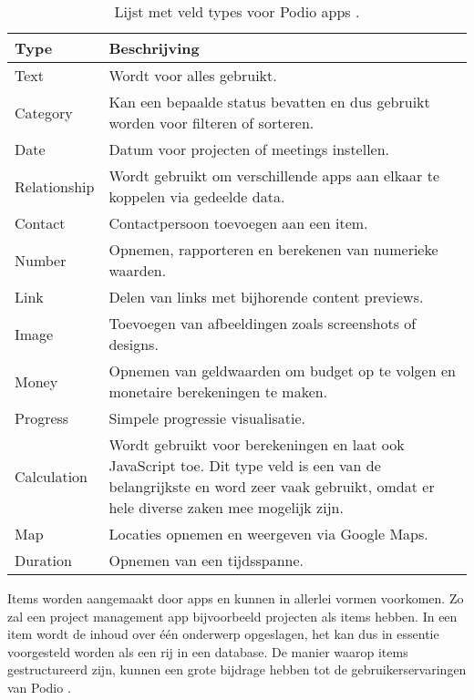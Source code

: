 \begin{table}[ht]
    \centering
    \caption{\label{tab:podio_velden} Lijst met veld types voor Podio apps \autocite{PodioFeatures}.}
    \begin{tabular}{ | p{3cm} | p{11cm} | }
        \hline
        \textbf{Type} & \textbf{Beschrijving} \\
        \hline\hline
        Text & Wordt voor alles gebruikt. \\
        Category & Kan een bepaalde status bevatten en dus gebruikt worden voor filteren of sorteren. \\
        Date & Datum voor projecten of meetings instellen. \\
        Relationship & Wordt gebruikt om verschillende apps aan elkaar te koppelen via gedeelde data. \\
        Contact & Contactpersoon toevoegen aan een item. \\
        Number & Opnemen, rapporteren en berekenen van numerieke waarden. \\
        Link & Delen van links met bijhorende content previews. \\
        Image & Toevoegen van afbeeldingen zoals screenshots of designs. \\
        Money & Opnemen van geldwaarden om budget op te volgen en monetaire berekeningen te maken. \\
        Progress & Simpele progressie visualisatie. \\
        Calculation & Wordt gebruikt voor berekeningen en laat ook JavaScript toe. Dit type veld is een van de belangrijkste en word zeer vaak gebruikt, omdat er hele diverse zaken mee mogelijk zijn. \\
        Map & Locaties opnemen en weergeven via Google Maps. \\
        Duration & Opnemen van een tijdsspanne. \\
        \hline
\end{tabular}
\end{table}
    
Items worden aangemaakt door apps en kunnen in allerlei vormen voorkomen. Zo zal een project management app bijvoorbeeld projecten als items hebben. In een item wordt de inhoud over één onderwerp opgeslagen, het kan dus in essentie voorgesteld worden als een rij in een database. De manier waarop items gestructureerd zijn, kunnen een grote bijdrage hebben tot de gebruikerservaringen van Podio \autocite{TallyfyPodio}. \\


